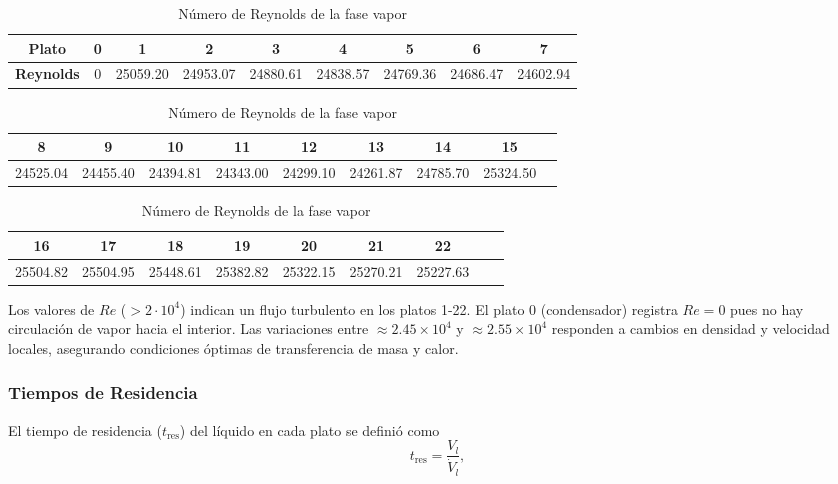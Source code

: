 \begin{table}[ht]
    \centering\small
    \begin{tabular}{|c|*{8}{c|}}
        \hline
        \textbf{Plato}    & 0 & 1        & 2        & 3        & 4        & 5        & 6        & 7        \\ \hline
        \textbf{Reynolds} & 0 & 25059.20 & 24953.07 & 24880.61 & 24838.57 & 24769.36 & 24686.47 & 24602.94 \\ \hline
    \end{tabular}

    \vspace{1em}
    \begin{tabular}{|c|*{8}{c|}}
        \hline
        8        & 9        & 10       & 11       & 12       & 13       & 14       & 15       \\ \hline
        24525.04 & 24455.40 & 24394.81 & 24343.00 & 24299.10 & 24261.87 & 24785.70 & 25324.50 \\ \hline
    \end{tabular}

    \vspace{1em}
    \begin{tabular}{|c|*{8}{c|}}
        \hline
        16       & 17       & 18       & 19       & 20       & 21       & 22       \\ \hline
        25504.82 & 25504.95 & 25448.61 & 25382.82 & 25322.15 & 25270.21 & 25227.63 \\ \hline
    \end{tabular}

    \vspace{1em}
    \caption{Número de Reynolds de la fase vapor}
\end{table}
\vspace{-1.5em}
Los valores de $Re$ ($>2\cdot 10^4$) indican un flujo turbulento en los platos 1-22. El plato 0 (condensador) registra $Re=0$ pues no hay circulación de vapor hacia el interior. Las variaciones entre $\approx2.45\times10^4$ y $\approx2.55\times10^4$ responden a cambios en densidad y velocidad locales, asegurando condiciones óptimas de transferencia de masa y calor.

\subsubsection{Tiempos de Residencia}

El tiempo de residencia ($t_{\text{res}}$) del líquido en cada plato se definió como
$$
    t_{\text{res}} = \frac{V_l}{\dot{V}_l},
$$

